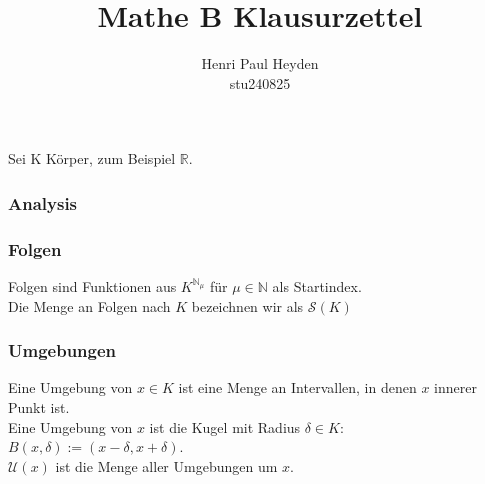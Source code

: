 \documentclass[12pt, a4paper]{article}
\title{Mathe B Klausurzettel}
\author{Henri Paul Heyden \\ \small{stu240825}}
\date{}
\begin{document}
\maketitle
\subsubsection*{}
Sei K Körper, zum Beispiel \(\mathbb R\).
\subsubsection*{Analysis}
\subsubsection*{Folgen}
Folgen sind Funktionen aus \(K ^ {\mathbb{N}_\mu}\) für \(\mu \in \mathbb{N}\) als Startindex. \\
Die Menge an Folgen nach \(K\) bezeichnen wir als \(\mathcal{S}(K)\)
\subsubsection*{Umgebungen}
Eine Umgebung von \(x\in K\) ist eine Menge an Intervallen, in denen \(x\) innerer Punkt ist. \\
Eine Umgebung von \(x\) ist die Kugel mit Radius \(\delta \in K\): \(B(x, \delta) := (x-\delta, x+\delta)\). \\
\(\mathcal{U}(x)\) ist die Menge aller Umgebungen um \(x\).
\end{document}
